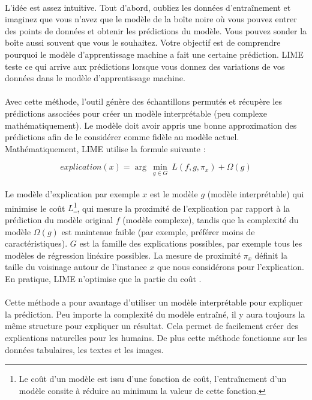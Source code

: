 \documentclass[10pt, french, a4paper]{report}
\begin{document}
\paragraph{}
L'idée est assez intuitive. Tout d'abord, oubliez les données d'entraînement et imaginez que vous n'avez que le modèle de la boîte noire où vous pouvez entrer des points de données et obtenir les prédictions du modèle. Vous pouvez sonder la boîte aussi souvent que vous le souhaitez. Votre objectif est de comprendre pourquoi le modèle d'apprentissage machine a fait une certaine prédiction. LIME teste ce qui arrive aux prédictions lorsque vous donnez des variations de vos données dans le modèle d'apprentissage machine.

\paragraph{}
Avec cette méthode, l'outil génère des échantillons permutés et récupère les prédictions associées pour créer un modèle interprétable (peu complexe mathématiquement). Le modèle doit avoir appris une bonne approximation des prédictions afin de le considérer comme fidèle au modèle actuel. Mathématiquement, LIME utilise la formule suivante :

\begin{equation}
  explication(x) = \arg\ \underset{g \in G}{\min}\ L(f,g,\pi_x) + \Omega(g)
\end{equation}

\paragraph{}
Le modèle d'explication par exemple $x$ est le modèle $g$ (modèle interprétable) qui minimise le coût $L$\footnote{Le coût d'un modèle est issu d'une fonction de coût, l'entraînement d'un modèle consite à réduire au minimum la valeur de cette fonction.}, qui mesure la proximité de l'explication par rapport à la prédiction du modèle original $f$ (modèle complexe), tandis que la complexité du modèle $\Omega(g)$ est maintenue faible (par exemple, préférer moins de caractéristiques). $G$ est la famille des explications possibles, par exemple tous les modèles de régression linéaire possibles. La mesure de proximité $\pi_x$ définit la taille du voisinage autour de l'instance $x$ que nous considérons pour l'explication. En pratique, LIME n'optimise que la partie du coût \citep{molnar2019}.

\paragraph{}
Cette méthode a pour avantage d'utiliser un modèle interprétable pour expliquer la prédiction. Peu importe la complexité du modèle entraîné, il y aura toujours la même structure pour expliquer un résultat. Cela permet de facilement créer des explications naturelles pour les humains. De plus cette méthode fonctionne sur les données tabulaires, les textes et les images. 
\end{document}
